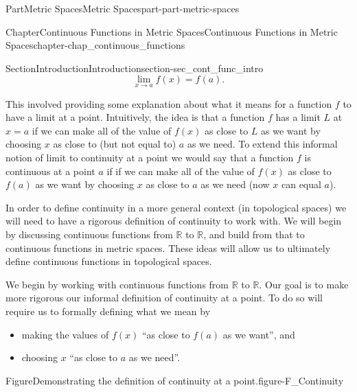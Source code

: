 \documentclass[oneside,10pt,]{book}
\numberwithin{equation}{chapter}
\newcommand{\R}{\mathbb{R}}
\begin{document}
\begin{partptx}{Part}{Metric Spaces}{}{Metric Spaces}{}{}{part-part-metric-spaces}
\begin{chapterptx}{Chapter}{Continuous Functions in Metric Spaces}{}{Continuous Functions in Metric Spaces}{}{}{chapter-chap_continuous_functions}
\begin{sectionptx}{Section}{Introduction}{}{Introduction}{}{}{section-sec_cont_func_intro}
\begin{equation*}
\lim_{x \to a} f(x) = f(a)\text{.}
\end{equation*}
%
\par
This involved providing some explanation about what it means for a function \(f\) to have a limit at a point. Intuitively, the idea is that a function \(f\) has a limit \(L\) at \(x=a\) if we can make all of the value of \(f(x)\) as close to \(L\) as we want by choosing \(x\) as close to (but not equal to) \(a\) as we need. To extend this informal notion of limit to continuity at a point we would say that a function \(f\) is continuous at a point \(a\) if if we can make all of the value of \(f(x)\) as close to \(f(a)\) as we want by choosing \(x\) as close to \(a\) as we need (now \(x\) can equal \(a\)).%
\par
In order to define continuity in a more general context (in topological spaces) we will need to have a rigorous definition of continuity to work with. We will begin by discussing continuous functions from \(\R\) to \(\R\), and build from that to continuous functions in metric spaces. These ideas will allow us to ultimately define continuous functions in topological spaces.%
\par
We begin by working with continuous functions from \(\R\) to \(\R\). Our goal is to make more rigorous our informal definition of continuity at a point. To do so will require us to formally defining what we mean by%
\begin{itemize}[label=\textbullet]
\item{}making the values of \(f(x)\) ``as close to \(f(a)\) as we want'', and%
\item{}choosing \(x\) ``as close to \(a\) as we need''.%
\end{itemize}
%
\begin{figureptx}{Figure}{Demonstrating the definition of continuity at a point.}{figure-F_Continuity}{}%
\begin{sidebyside}{2}{0}{0}{0}%
\begin{sbspanel}{0.5}%

\end{sbspanel}
\end{sidebyside}
\end{figureptx}
\end{sectionptx}
\end{chapterptx}
\end{partptx}
\end{document}
